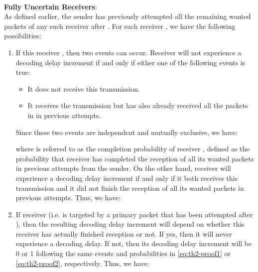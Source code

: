 \documentclass[10pt,jounral]{IEEEtran}
\begin{document}
{\begin{enumerate}
\end{enumerate}
\\
\textbf{Fully Uncertain Receivers}: \\
As defined earlier, the sender has previously attempted all the remaining wanted packets of any such receiver  after .
For such receiver , we have the following possibilities:
\begin{enumerate}
\item If this receiver , then two events can occur. Receiver  will not experience a decoding delay increment if and only if either one of the following events is true:
\begin{itemize}
\item It does not receive this transmission.
\item It receives the transmission but has also already received all the packets in  in previous attempts.
\end{itemize}
Since these two events are independent and mutually exclusive, we have:

where  is referred to as the completion probability of receiver , defined as the probability that receiver  has completed the reception of all its wanted packets in previous attempts from the sender. On the other hand, receiver  will experience a decoding delay increment if and only if it both receives this transmission and it did not finish the reception of all its wanted packets in previous attempts. Thus, we have:

\item If receiver  (i.e.  is targeted by a primary packet that has been attempted after ), then the resulting decoding delay increment will depend on whether this receiver has actually finished reception or not. If yes, then it will never experience a decoding delay. If not, then its decoding delay increment will be 0 or 1 following the same events and probabilities in \eqref{eq:th2-proof1} or \eqref{eq:th2-proof2}, respectively. Thus, we have:

\end{enumerate}
}
\end{document}
